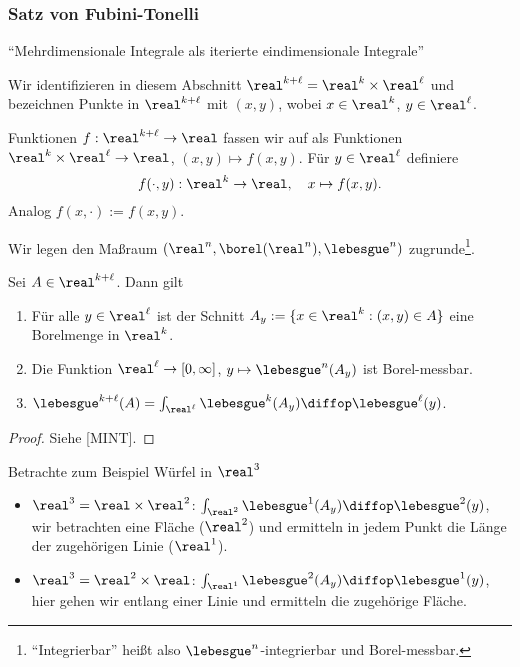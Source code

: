 \subsubsection{Satz von Fubini-Tonelli}\label{sect:tonelli}
``Mehrdimensionale Integrale als iterierte eindimensionale Integrale''

Wir identifizieren in diesem Abschnitt $\real^{k+\ell} = \real^k \times \real^\ell$ und bezeichnen Punkte in $\real^{k + \ell}$ mit $(x,y)$, wobei $x \in \real^k$, $y \in \real^\ell$.

Funktionen $f: \real^{k+\ell} \to \real$ fassen wir auf als Funktionen $\real^k \times \real^\ell \to \real$, $(x,y) \mapsto f(x,y)$. Für $y \in \real^\ell$ definiere 
\[ f( \cdot, y ) : \real^k \to \real, \quad x \mapsto f(x,y). \]
Analog $f( x, \cdot ) := f(x,y)$.

Wir legen den Maßraum $(\real^n, \borel(\real^n), \lebesgue^n)$ zugrunde\footnote{``Integrierbar'' heißt also $\lebesgue^n$-integrierbar und Borel-messbar.}.

\begin{lem}[Cavalieri]
Sei $A \in \real^{k+\ell}$. Dann gilt
\begin{enumerate}
 \item Für alle $y \in \real^\ell$ ist der Schnitt $A_y := \{ x \in \real^k : (x,y) \in A \}$ eine Borelmenge in $\real^k$.
 \item Die Funktion $\real^\ell \to [0,\infty]$, $y \mapsto \lebesgue^n(A_y)$ ist Borel-messbar.
 \item $\lebesgue^{k+\ell} (A) = \int_{\real^\ell} \lebesgue^k (A_y) \diffop \lebesgue^\ell(y)$.
\end{enumerate}
\end{lem}

\begin{proof}
 Siehe [MINT].
\end{proof}

Betrachte zum Beispiel Würfel in $\real^3$
\begin{itemize}
 \item $\real^3 = \real \times \real^2$: $\int_{\real^2} \lebesgue^1 (A_y) \diffop \lebesgue^2(y)$, wir betrachten eine Fläche ($\real^2$) und ermitteln in jedem Punkt die Länge der zugehörigen Linie ($\real^1$).
 \item $\real^3 = \real^2 \times \real$: $\int_{\real^1} \lebesgue^2 (A_y) \diffop \lebesgue^1(y)$, hier gehen wir entlang einer Linie und ermitteln die zugehörige Fläche.
\end{itemize}

